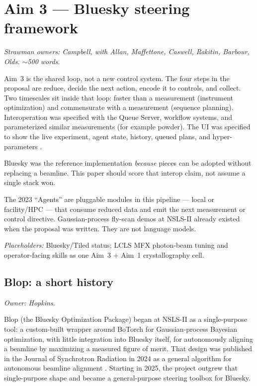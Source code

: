 \section{Aim 3 --- Bluesky steering framework}
\label{sec:aim3}

\textit{Strawman owners: Campbell, with Allan, Maffettone, Caswell, Rakitin,
Barbour, Olds. $\sim$500 words.}

Aim~3 is the shared loop, not a new control system. The four steps in the
proposal are reduce, decide the next action, encode it to controls, and
collect. Two timescales sit inside that loop: faster than a measurement
(instrument optimization) and commensurate with a measurement (sequence
planning). Interoperation was specified with the Queue Server, workflow
systems, and parameterized similar measurements (for example powder). The UI
was specified to show the live experiment, agent state, history, queued plans,
and hyper-parameters \cite{allan2019bluesky}.

Bluesky was the reference implementation \emph{because} pieces can be adopted
without replacing a beamline. This paper should score that interop claim, not
assume a single stack won.

The 2023 ``Agents'' are pluggable modules in this pipeline --- local or
facility/HPC --- that consume reduced data and emit the next measurement or
control directive. Gaussian-process fly-scan demos at NSLS-II already existed
when the proposal was written. They are not language models.

\textit{Placeholders:} Bluesky/Tiled status; LCLS MFX photon-beam tuning and
operator-facing skills as one Aim~3 + Aim~1 crystallography cell.


\subsection{Blop: a short history}
\textit{Owner: Hopkins.}

Blop (the Bluesky Optimization Package) began at NSLS-II as a single-purpose tool:
a custom-built wrapper around BoTorch for Gaussian-process Bayesian optimization,
with little integration into Bluesky itself, for autonomously aligning a beamline
by maximizing a measured figure of merit. That design was published in the
Journal of Synchrotron Radiation in 2024 as a general algorithm for autonomous
beamline alignment \cite{Morris2024}. Starting in 2025, the project outgrew that
single-purpose shape and became a general-purpose steering toolbox for Bluesky.

